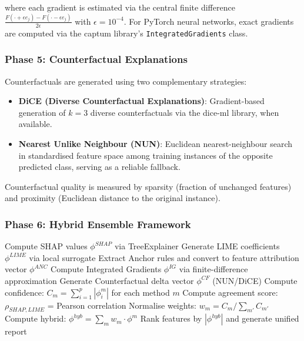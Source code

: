 \documentclass[journal]{IEEEtran}
\begin{document}
where each gradient is estimated via the central finite difference $\frac{F(\cdot + \epsilon e_j) - F(\cdot - \epsilon e_j)}{2\epsilon}$ with $\epsilon = 10^{-4}$. For PyTorch neural networks, exact gradients are computed via the captum library's \texttt{IntegratedGradients} class.

\subsubsection{Phase 5: Counterfactual Explanations}

Counterfactuals are generated using two complementary strategies:
\begin{itemize}
\item \textbf{DiCE (Diverse Counterfactual Explanations)}: Gradient-based generation of $k=3$ diverse counterfactuals via the dice-ml library, when available.
\item \textbf{Nearest Unlike Neighbour (NUN)}: Euclidean nearest-neighbour search in standardised feature space among training instances of the opposite predicted class, serving as a reliable fallback.
\end{itemize}

Counterfactual quality is measured by sparsity (fraction of unchanged features) and proximity (Euclidean distance to the original instance).

\subsubsection{Phase 6: Hybrid Ensemble Framework}

\begin{algorithm}
\caption{Hybrid XAI Ensemble}
\begin{algorithmic}[1]
\STATE Compute SHAP values $\phi^{SHAP}$ via TreeExplainer
\STATE Generate LIME coefficients $\phi^{LIME}$ via local surrogate
\STATE Extract Anchor rules and convert to feature attribution vector $\phi^{ANC}$
\STATE Compute Integrated Gradients $\phi^{IG}$ via finite-difference approximation
\STATE Generate Counterfactual delta vector $\phi^{CF}$ (NUN/DiCE)
\STATE Compute confidence: $C_m = \sum_{i=1}^{p}|\phi_i^m|$ for each method $m$
\STATE Compute agreement score: $\rho_{SHAP,LIME}$ = Pearson correlation
\STATE Normalise weights: $w_m = C_m / \sum_{m'} C_{m'}$
\STATE Compute hybrid: $\phi^{hyb} = \sum_m w_m \cdot \phi^m$
\STATE Rank features by $|\phi^{hyb}|$ and generate unified report
\end{algorithmic}
\end{algorithm}
\end{document}
